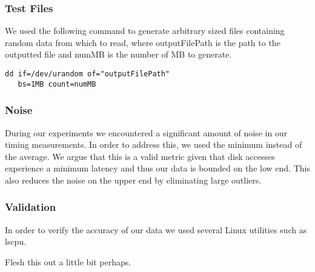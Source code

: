 \subsubsection{Test Files}
We used the following command to generate arbitrary sized files containing random
data from which to read, where outputFilePath is the path to the outputted file and numMB is the number of MB to generate.

\begin{verbatim}
dd if=/dev/urandom of="outputFilePath" 
   bs=1MB count=numMB
\end{verbatim}

\subsubsection{Noise}
During our experiments we encountered a significant amount of noise in our timing measurements. In order to address this, we used the minimum instead of the average. 
We argue that this is a valid metric given that disk accesses experience a minimum latency and thus our data is bounded on the low end. This also reduces the noise on the upper end by eliminating large outliers.

\subsubsection{Validation}
In order to verify the accuracy of our data we used several Linux utilities such as
lscpu. 

Flesh this out a little bit perhaps.

